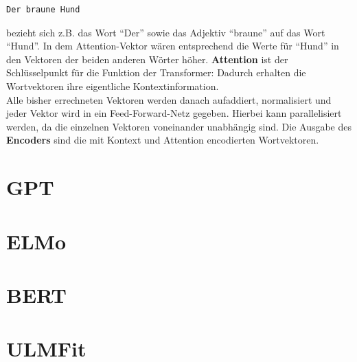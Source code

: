 \begin{verbatim} 
Der braune Hund
\end{verbatim} 
bezieht sich z.B. das Wort "`Der"' sowie das Adjektiv "`braune"' auf das Wort "`Hund"'. In dem Attention-Vektor w\"aren entsprechend die Werte f\"ur "`Hund"' in den Vektoren der beiden anderen W\"orter h\"oher. \textbf{Attention} ist der Schl\"usselpunkt f\"ur die Funktion der Transformer: Dadurch erhalten die Wortvektoren ihre eigentliche Kontextinformation.\\
Alle bisher errechneten Vektoren werden danach aufaddiert, normalisiert und jeder Vektor wird in ein Feed-Forward-Netz gegeben. Hierbei kann parallelisiert werden, da die einzelnen Vektoren voneinander unabh\"angig sind. Die Ausgabe des \textbf{Encoders} sind die mit Kontext und Attention encodierten Wortvektoren.\\

\section{GPT}


\section{ELMo}

\section{BERT}


\section{ULMFit}
